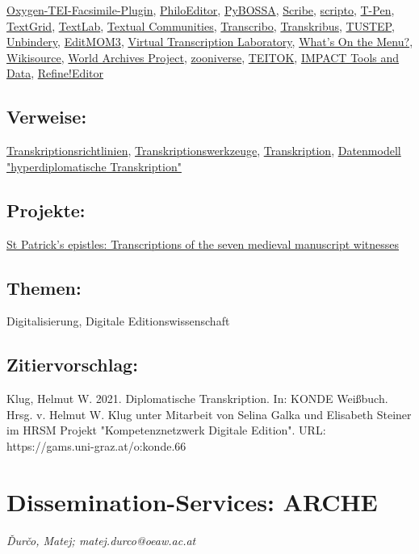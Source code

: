 \documentclass{article}
\begin{document}
\href{https://github.com/oxygenxml/TEI-Facsimile-Plugin}{Oxygen-TEI-Facsimile-Plugin}, \href{http://www.fabiovitali.it/filologia/}{PhiloEditor}, \href{http://pybossa.com/}{PyBOSSA}, \href{http://github.com/zooniverse/Scribe}{Scribe}, \href{http://scripto.org/}{scripto}, \href{http://t-pen.org/TPEN/}{T-Pen}, \href{https://textgrid.de/}{TextGrid}, \href{https://www.textlab.org/about/}{TextLab}, \href{https://textualcommunities.org/app/}{Textual Communities}, \href{http://transcribo.org/en/}{Transcribo}, \href{https://transkribus.eu/Transkribus/}{Transkribus}, \href{http://www.tustep.uni-tuebingen.de/}{TUSTEP}, \href{http://bencrowder.net/coding/unbindery/}{Unbindery}, \href{https://docs.google.com/document/d/1QsFodbmuOld4ZAmnURR2tKewE1tgRo1cGxpaIUy92Mw/edit}{EditMOM3}, \href{http://wlt.synat.pcss.pl/}{Virtual Transcription Laboratory}, \href{http://menus.nypl.org/}{What's On the Menu?}, \href{http://en.wikisource.org/wiki/Main_Page}{Wikisource}, \href{http://community.ancestry.co.uk/awap}{World Archives Project}, \href{https://www.zooniverse.org/}{zooniverse}, \href{http://www.teitok.org/index.php?action=about}{TEITOK}, \href{https://www.digitisation.eu}{IMPACT Tools and Data}, \href{https://3pc.de/}{Refine!Editor}\subsection*{Verweise:}\href{https://gams.uni-graz.at/o:konde.198}{Transkriptionsrichtlinien}, \href{https://gams.uni-graz.at/o:konde.199}{Transkriptionswerkzeuge}, \href{https://gams.uni-graz.at/o:konde.197}{Transkription}, \href{https://gams.uni-graz.at/o:konde.50}{Datenmodell "hyperdiplomatische Transkription"}\subsection*{Projekte:}\href{http://gams.uni-graz.at/context:epistles}{St Patrick's epistles: Transcriptions of the seven medieval manuscript witnesses}\subsection*{Themen:}Digitalisierung, Digitale Editionswissenschaft\subsection*{Zitiervorschlag:}Klug, Helmut W. 2021. Diplomatische Transkription. In: KONDE Weißbuch. Hrsg. v. Helmut W. Klug unter Mitarbeit von Selina Galka und Elisabeth Steiner im HRSM Projekt "Kompetenznetzwerk Digitale Edition". URL: https://gams.uni-graz.at/o:konde.66\newpage\section*{Dissemination-Services: ARCHE} \emph{Ďurčo, Matej; matej.durco@oeaw.ac.at}\\
        
\end{document}
